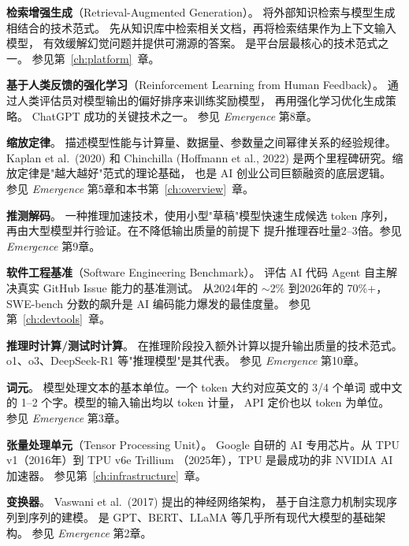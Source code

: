 \begin{description}[style=nextline, leftmargin=2.5cm, labelwidth=2.3cm, font=\bfseries]
\item[RAG]
\textbf{检索增强生成}（Retrieval-Augmented Generation）。
将外部知识检索与模型生成相结合的技术范式。
先从知识库中检索相关文档，再将检索结果作为上下文输入模型，
有效缓解幻觉问题并提供可溯源的答案。
是平台层最核心的技术范式之一。
参见第~\ref{ch:platform}~章。

\item[RLHF]
\textbf{基于人类反馈的强化学习}（Reinforcement Learning from Human Feedback）。
通过人类评估员对模型输出的偏好排序来训练奖励模型，
再用强化学习优化生成策略。
ChatGPT 成功的关键技术之一。
参见 \textit{Emergence} 第8章。

\item[Scaling Law]
\textbf{缩放定律}。
描述模型性能与计算量、数据量、参数量之间幂律关系的经验规律。
Kaplan et al.\ (2020) 和 Chinchilla (Hoffmann et al., 2022)
是两个里程碑研究。缩放定律是"越大越好"范式的理论基础，
也是 AI 创业公司巨额融资的底层逻辑。
参见 \textit{Emergence} 第5章和本书第~\ref{ch:overview}~章。

\item[Speculative Decoding]
\textbf{推测解码}。
一种推理加速技术，使用小型"草稿"模型快速生成候选 token 序列，
再由大型模型并行验证。在不降低输出质量的前提下
提升推理吞吐量2--3倍。参见 \textit{Emergence} 第9章。

\item[SWE-bench]
\textbf{软件工程基准}（Software Engineering Benchmark）。
评估 AI 代码 Agent 自主解决真实 GitHub Issue 能力的基准测试。
从2024年的 $\sim$2\% 到2026年的 70\%+，
SWE-bench 分数的飙升是 AI 编码能力爆发的最佳度量。
参见第~\ref{ch:devtools}~章。

\item[Test-time Compute]
\textbf{推理时计算/测试时计算}。
在推理阶段投入额外计算以提升输出质量的技术范式。
o1、o3、DeepSeek-R1 等"推理模型"是其代表。
参见 \textit{Emergence} 第10章。

\item[Token]
\textbf{词元}。
模型处理文本的基本单位。一个 token 大约对应英文的 3/4 个单词
或中文的 1--2 个字。模型的输入输出均以 token 计量，
API 定价也以 token 为单位。
参见 \textit{Emergence} 第3章。

\item[TPU]
\textbf{张量处理单元}（Tensor Processing Unit）。
Google 自研的 AI 专用芯片。从 TPU v1（2016年）到 TPU v6e Trillium
（2025年），TPU 是最成功的非 NVIDIA AI 加速器。
参见第~\ref{ch:infrastructure}~章。

\item[Transformer]
\textbf{变换器}。
Vaswani et al.\ (2017) 提出的神经网络架构，
基于自注意力机制实现序列到序列的建模。
是 GPT、BERT、LLaMA 等几乎所有现代大模型的基础架构。
参见 \textit{Emergence} 第2章。


\end{description}

